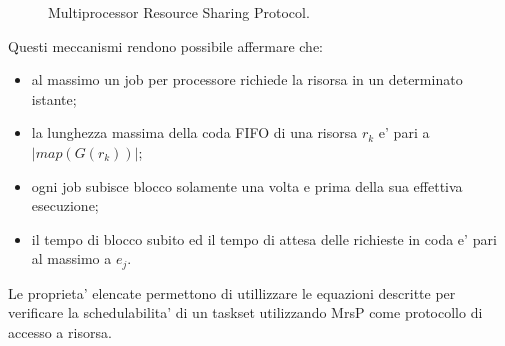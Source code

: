 \begin{figure}
\centering
{}
\caption{Multiprocessor Resource Sharing Protocol.}
\label{fig:locks.mrsp}
\end{figure}

Questi meccanismi rendono possibile affermare che:

\begin{itemize}
\item al massimo un job per processore richiede la risorsa in un determinato istante;
\item la lunghezza massima della coda FIFO di una risorsa $r_k$ e’ pari a $| map(G(r_k)) |$;
\item ogni job subisce blocco solamente una volta e prima della sua effettiva esecuzione;
\item il tempo di blocco subito ed il tempo di attesa delle richieste in coda e’ pari al massimo a $e_j$.
\end{itemize}

Le proprieta’ elencate permettono di utillizzare le equazioni descritte per verificare la schedulabilita’ di un taskset utilizzando MrsP come protocollo di accesso a risorsa.\\